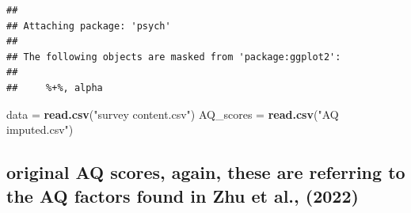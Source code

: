 \documentclass[
]{article}
\newenvironment{Shaded}{\begin{snugshade}}{\end{snugshade}}
\newcommand{\FunctionTok}[1]{\textcolor[rgb]{0.13,0.29,0.53}{\textbf{#1}}}
\newcommand{\NormalTok}[1]{#1}
\newcommand{\OtherTok}[1]{\textcolor[rgb]{0.56,0.35,0.01}{#1}}
\newcommand{\StringTok}[1]{\textcolor[rgb]{0.31,0.60,0.02}{#1}}
\begin{document}
\begin{verbatim}
## 
## Attaching package: 'psych'
## 
## The following objects are masked from 'package:ggplot2':
## 
##     %+%, alpha
\end{verbatim}

\begin{Shaded}
\begin{Highlighting}[]
\NormalTok{data }\OtherTok{=} \FunctionTok{read.csv}\NormalTok{(}\StringTok{"survey content.csv"}\NormalTok{)}
\NormalTok{AQ\_scores }\OtherTok{=} \FunctionTok{read.csv}\NormalTok{(}\StringTok{"AQ imputed.csv"}\NormalTok{)}
\end{Highlighting}
\end{Shaded}

\subsection{original AQ scores, again, these are referring to the AQ
factors found in Zhu et al.,
(2022)}\label{original-aq-scores-again-these-are-referring-to-the-aq-factors-found-in-zhu-et-al.-2022}
\end{document}
